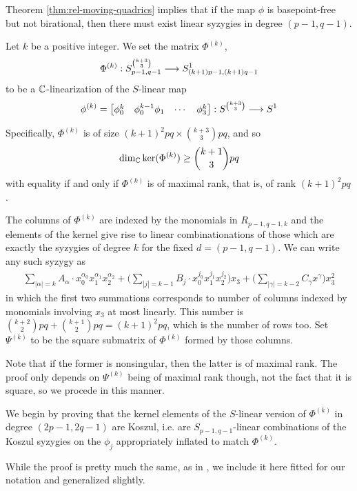 \documentclass[fleqn,reqno]{amsart}
\numberwithin{first}{chapter}
\numberwithin{section}{chapter}
\numberwithin{equation}{first}
\begin{document}
\begin{remark}
	Theorem \ref{thm:rel-moving-quadrics} implies that if the map $\phi$ is basepoint-free but not birational,
	then there must exist linear syzygies in degree $(p-1,q-1)$.
\end{remark}

\begin{paragraph}
\label{par:count-rels}
Let $k$ be a positive integer. We set the matrix $\Phi^{(k)}$,
\[
	\Phi^{(k)}:S_{p-1,q-1}^{\binom{k+3}{3}}\longrightarrow S_{(k+1)p-1,(k+1)q-1}^1
\]
to be a $\mathbb{C}$-linearization of the $S$-linear map
\[
	\phi^{(k)}=\begin{bmatrix}\phi_0^k& \phi_0^{k-1}\phi_1& \cdots& \phi_3^k\end{bmatrix}:
	S^{\binom{k+3}{3}}\longrightarrow S^1
\]

Specifically, $\Phi^{(k)}$ is of size $(k+1)^2pq\times\binom{k+3}{3}pq$, and so
\begin{align}
	\dim_{\mathbb{C}}\ker(\Phi^{(k)})\geq\binom{k+1}{3}pq\label{eqn1}
\end{align}
with equality if and only if $\Phi^{(k)}$ is of maximal rank, that is, of rank $(k+1)^2pq$.
\end{paragraph}

\begin{paragraph}
	The columns of $\Phi^{(k)}$ are indexed by the monomials in $R_{p-1,q-1,k}$ and the elements
	of the kernel give rise to linear combinationations of those which are exactly
	the syzygies of degree $k$ for the fixed $d=(p-1,q-1)$. We can write any such syzygy as
	\begin{align}\label{ebasi}
		\sum_{|\alpha|=k} A_\alpha\cdot
		x_0^{\alpha_0}x_1^{\alpha_1}x_2^{\alpha_2}+
		\big(\sum_{|j|=k-1} B_{j}\cdot
		x_0^{j_0}x_1^{j_1}x_2^{j_2}\big)x_3+
		\big(\sum_{|\gamma|=k-2}C_\gamma x^\gamma\big)x_3^2
	\end{align}
	in which the first two summations corresponds to number of columns indexed by
	monomials involving $x_3$ at most linearly.
	This number is $\binom{k+2}{2}pq+\binom{k+1}{2}pq=(k+1)^2pq$, which is the number of rows too.
	Set $\Psi^{(k)}$ to be the square submatrix of $\Phi^{(k)}$ formed by those columns.
	
	Note that if the former is nonsingular, then the latter is of maximal rank. The proof only
	depends on $\Psi^{(k)}$ being of maximal rank though, not the fact that it is square,
	so we procede in this manner.
\end{paragraph}

\begin{paragraph*}
	We begin by proving that the kernel elements of the $S$-linear version of $\Phi^{(k)}$
	in degree $(2p-1,2q-1)$ are Koszul,
	i.e. are $S_{p-1,q-1}$-linear combinations of the Koszul syzygies on the $\phi_j$
	appropriately inflated to match $\Phi^{(k)}$.
	
	While the proof is pretty much the same, as in \citet{00-CGZ-JSC},
	we include it here fitted for our notation and generalized slightly.
\end{paragraph*}
\end{document}
